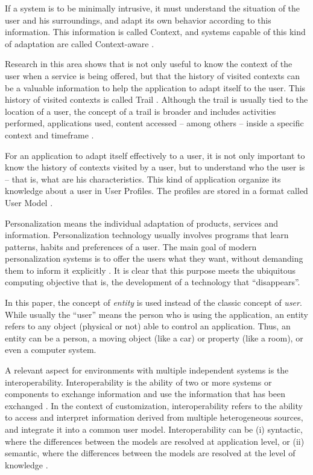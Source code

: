 \documentclass[preprint,authoryear,12pt,dvipdfm]{elsarticle}
\begin{document}
If a system is to be minimally intrusive, it must understand the situation of the user and his surroundings, and adapt its own behavior according to this information. This information is called Context, and systems capable of this kind of adaptation are called Context-aware \citep{satyanarayanan01,dey2001}. 

Research in this area shows that is not only useful to know the context of the user when a service is being offered, but that the history of visited contexts can be a valuable information to help the application to adapt itself to the user. This history of visited contexts is called Trail \citep{driver08}. Although the trail is usually tied to the location of a user, the concept of a trail is broader and includes activities performed, applications used, content accessed -- among others -- inside a specific context and timeframe \citep{silva10}.


For an application to adapt itself effectively to a user, it is not only important to know the history of contexts visited by a user, but to understand who the user is -- that is, what are his characteristics. This kind of application organize its knowledge about a user in User Profiles. The profiles are stored in a format called User Model \citep{fischer01,viviani10}.


Personalization means the individual adaptation of products, services and information. Personalization technology usually involves programs that learn patterns, habits and preferences of a user. The main goal of modern personalization systems is to offer the users what they want, without demanding them to inform it explicitly \citep{mulvenna00}. It is clear that this purpose meets the ubiquitous computing objective that is, the development of a technology that ``disappears''.

In this paper, the concept of {\em entity} is used instead of the classic concept of {\em user}. While usually the ``user'' means the person who is using the application, an entity refers to any object (physical or not) able to control an application.  Thus, an entity can be a person, a moving object (like a car) or property (like a room), or even a computer system. 

A relevant aspect for environments with multiple independent systems is the interoperability. Interoperability is the ability of two or more systems or components to exchange information and use the information that has been exchanged \citep{ieeedict}. In the context of customization, interoperability refers to the ability to access and interpret information derived from multiple heterogeneous sources, and integrate it into a common user model. Interoperability can be (i) syntactic, where the differences between the models are resolved at application level, or (ii) semantic, where the differences between the models are resolved at the level of knowledge \citep{carmagnola09}.
\end{document}

